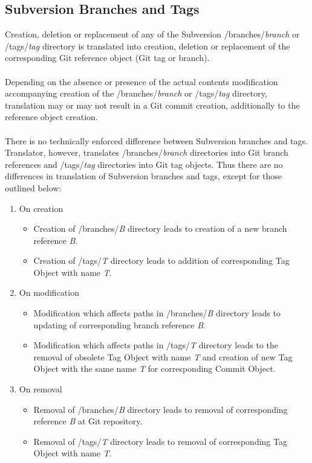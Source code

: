 \subsection{Subversion Branches and Tags}
\label{section_branches_and_tags}
\renewcommand{\figurename}{Diagram}

Creation, deletion or replacement of any of the Subversion /branches/\emph{branch} or /tags/\emph{tag} directory
is translated into creation, deletion or replacement of the corresponding Git reference object (Git tag or branch). 
\\\\
Depending on the absence or presence of the actual contents modification accompanying creation of the /branches/\emph{branch} 
or /tags/\emph{tag} directory, translation may or may not result in a Git commit creation, additionally 
to the reference object creation.
\\\\
There is no technically enforced difference between Subversion branches and tags. Translator, however, translates
/branches/\emph{branch} directories into Git branch references and /tags/\emph{tag} directories into Git tag objects.
Thus there are no differences in translation of Subversion branches and tags, except for those outlined below:
\begin{enumerate}
	\compactlist
	\item On creation
	\begin{itemize}
		\item Creation of /branches/\emph{B} directory leads to creation of a new branch reference \emph{B}.
		\item Creation of /tags/\emph{T} directory leads to addition of corresponding Tag Object with name \emph{T}.
	\end{itemize}
	\item On modification
	\begin{itemize}
		\item Modification which affects paths in /branches/\emph{B} directory leads to updating of corresponding branch reference \emph{B}.
		\item Modification which affects paths in /tags/\emph{T} directory leads to the removal of obsolete Tag Object with name \emph{T} and creation of new Tag Object with the same name \emph{T} for corresponding Commit Object.
	\end{itemize}
	\item On removal
	\begin{itemize}
		\item Removal of /branches/\emph{B} directory leads to removal of corresponding reference \emph{B} at Git repository.
		\item Removal of /tags/\emph{T} directory leads to removal of corresponding Tag Object with name \emph{T}.
	\end{itemize}
\end{enumerate}
